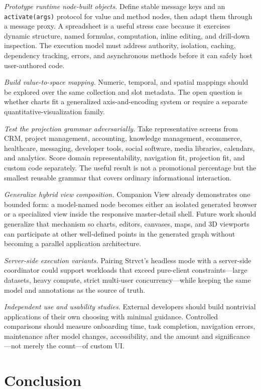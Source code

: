 \documentclass[sigplan,review,anonymous,10pt]{acmart}
\begin{document}
\emph{Prototype runtime node-built objects.} Define stable message keys and an \texttt{activate(args)} protocol for value and method nodes, then adapt them through a message proxy. A spreadsheet is a useful stress case because it exercises dynamic structure, named formulas, computation, inline editing, and drill-down inspection. The execution model must address authority, isolation, caching, dependency tracking, errors, and asynchronous methods before it can safely host user-authored code.

\emph{Build value-to-space mapping.} Numeric, temporal, and spatial mappings should be explored over the same collection and slot metadata. The open question is whether charts fit a generalized axis-and-encoding system or require a separate quantitative-visualization family.

\emph{Test the projection grammar adversarially.} Take representative screens from CRM, project management, accounting, knowledge management, ecommerce, healthcare, messaging, developer tools, social software, media libraries, calendars, and analytics. Score domain representability, navigation fit, projection fit, and custom code separately. The useful result is not a promotional percentage but the smallest reusable grammar that covers ordinary informational interaction.

\emph{Generalize hybrid view composition.} Companion View already demonstrates one bounded form: a model-named node becomes either an isolated generated browser or a specialized view inside the responsive master-detail shell. Future work should generalize that mechanism so charts, editors, canvases, maps, and 3D viewports can participate at other well-defined points in the generated graph without becoming a parallel application architecture.

\emph{Server-side execution variants.} Pairing Strvct's headless mode with a server-side coordinator could support workloads that exceed pure-client constraints---large datasets, heavy compute, strict multi-user concurrency---while keeping the same model and annotations as the source of truth.

\emph{Independent use and usability studies.} External developers should build nontrivial applications of their own choosing with minimal guidance. Controlled comparisons should measure onboarding time, task completion, navigation errors, maintenance after model changes, accessibility, and the amount and significance---not merely the count---of custom UI.

\section{Conclusion}
\end{document}
